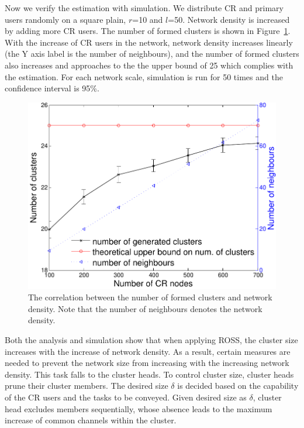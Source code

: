 \documentclass[10pt,journal,compsoc]{IEEEtran}
\theoremstyle{mytheoremstyle}
\theoremstyle{mytheoremstyle}
\theoremstyle{mytheoremstyle}
\begin{document}
Now we verify the estimation with simulation.
We distribute CR and primary users randomly on a square plain, $r$=10 and $l$=50.
Network density is increased by adding more CR users.
The number of formed clusters is shown in Figure~\ref{number_clusters_scale}.
With the increase of CR users in the network, network density increases linearly (the Y axis label is the number of neighbours), and the number of formed clusters also increases and approaches to the the upper bound of 25 which complies with the estimation.
For each network scale, simulation is run for 50 times and the confidence interval is 95\%.

\begin{figure}[h]
  \centering
  \includegraphics[width=0.8\linewidth]{number_clusters_upperBound.pdf}
  \caption{The correlation between the number of formed clusters and network density. Note that the number of neighbours denotes the network density.}
  \label{number_clusters_scale}
\end{figure}

Both the analysis and simulation show that when applying ROSS, the cluster size increases with the increase of network density.
As a result, certain measures are needed to prevent the network size from increasing with the increasing network density.
This task falls to the cluster heads.
To control cluster size, cluster heads prune their cluster members.
The desired size $\delta$ is decided based on the capability of the CR users and the tasks to be conveyed.
Given desired size as $\delta$, cluster head excludes members sequentially, whose absence leads to the maximum increase of common channels within the cluster.
\end{document}
